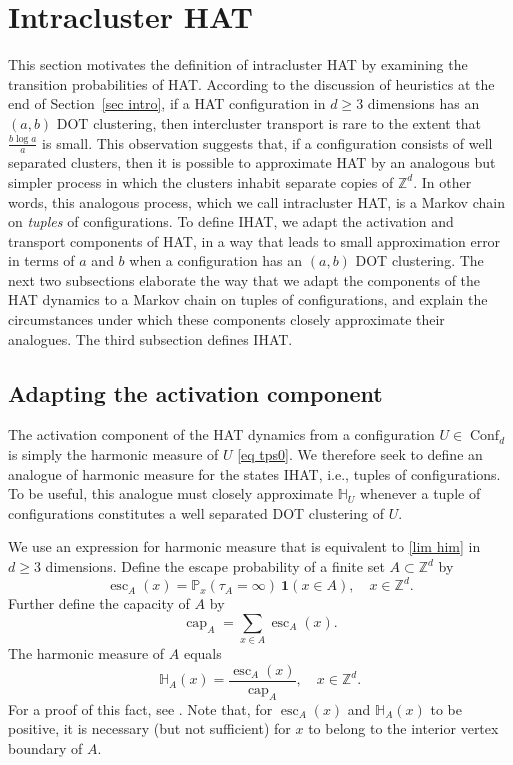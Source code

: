 \documentclass[11pt,reqno]{amsart}
\theoremstyle{definition}
\numberwithin{equation}{section}
\newcommand{\Z}{\mathbb{Z}}
\renewcommand{\P}{\mathbb{P}}
\newcommand{\1}{\mathbf{1}}
\renewcommand{\H}{\mathbb{H}}
\DeclareMathOperator{\capac}{cap}
\DeclareMathOperator{\Es}{esc}
\DeclareMathOperator{\Conf}{\mathrm{Conf}}
\begin{document}
\section{Intracluster HAT}\label{sec intra}

This section motivates the definition of intracluster HAT by examining the transition probabilities of HAT. According to the discussion of heuristics at the end of Section~\ref{sec intro}, if a HAT configuration in $d \geq 3$ dimensions has an $(a,b)$ DOT clustering, then intercluster transport is rare to the extent that $\frac{b \log a}{a}$ is small. This observation suggests that, if a configuration consists of well separated clusters, then it is possible to approximate HAT by an analogous but simpler process in which the clusters inhabit separate copies of $\Z^d$. In other words, this analogous process, which we call intracluster HAT, is a Markov chain on {\em tuples} of configurations. To define IHAT, we adapt the activation and transport components of HAT, in a way that leads to small approximation error in terms of $a$ and $b$ when a configuration has an $(a,b)$ DOT clustering. The next two subsections elaborate the way that we adapt the components of the HAT dynamics to a Markov chain on tuples of configurations, and explain the circumstances under which these components closely approximate their analogues. The third subsection defines IHAT.

\subsection{Adapting the activation component}

The activation component of the HAT dynamics from a configuration $U \in \Conf_d$ is simply the harmonic measure of $U$ \eqref{eq tps0}. We therefore seek to define an analogue of harmonic measure for the states IHAT, i.e., tuples of configurations. To be useful, this analogue must closely approximate $\H_U$ whenever a tuple of configurations constitutes a well separated DOT clustering of $U$.

We use an expression for harmonic measure that is equivalent to \eqref{lim him} in $d \geq 3$ dimensions. Define the escape probability of a finite set $A \subset \Z^d$ by
\[
\Es_A (x) = \P_x (\tau_A = \infty) \ \1 (x \in A), \quad x \in \Z^d.
\]
Further define the capacity of $A$ by
\[
\capac_A = \sum_{x \in A} \Es_A (x).
\]
The harmonic measure of $A$ equals
\begin{equation*}
\H_A (x) = \frac{\Es_A (x)}{\capac_A}, \quad x \in \Z^d.
\end{equation*}
For a proof of this fact, see \cite[Theorem 2.1.3]{lawler2013intersections}. Note that, for $\Es_A (x)$ and $\H_A (x)$ to be positive, it is necessary (but not sufficient) for $x$ to belong to the interior vertex boundary of $A$. 
\end{document}
